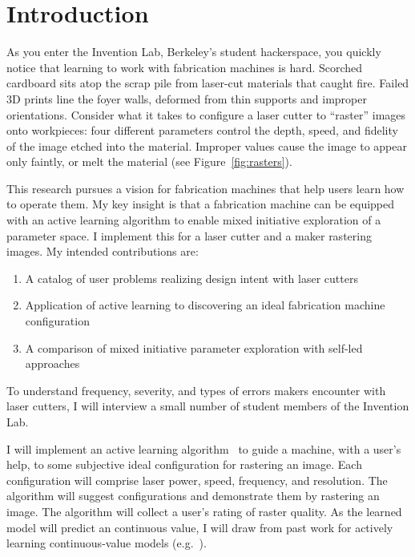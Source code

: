 \section{Introduction}

As you enter the Invention Lab, Berkeley's student hackerspace, you quickly notice that learning to work with fabrication machines is hard.
Scorched cardboard sits atop the scrap pile from laser-cut materials that caught fire.
Failed 3D prints line the foyer walls, deformed from thin supports and improper orientations.
Consider what it takes to configure a laser cutter to ``raster'' images onto workpieces:
four different parameters control the depth, speed, and fidelity of the image etched into the material.
Improper values cause the image to appear only faintly, or melt the material (see Figure~\ref{fig:rasters}).

This research pursues a vision for fabrication machines that help users learn how to operate them.
My key insight is that a fabrication machine can be equipped with an active learning algorithm to enable mixed initiative exploration of a parameter space.
I implement this for a laser cutter and a maker rastering images.
My intended contributions are:
\begin{enumerate}
\item A catalog of user problems realizing design intent with laser cutters
\item Application of active learning to discovering an ideal fabrication machine configuration
\item A comparison of mixed initiative parameter exploration with self-led approaches
\end{enumerate}

To understand frequency, severity, and types of errors makers encounter with laser cutters, I will interview a small number of student members of the Invention Lab.

I will implement an active learning algorithm~\cite{settles_active_2010} to guide a machine, with a user's help, to some subjective ideal configuration for rastering an image.
Each configuration will comprise laser power, speed, frequency, and resolution.
The algorithm will suggest configurations and demonstrate them by rastering an image.
The algorithm will collect a user's rating of raster quality.
As the learned model will predict an continuous value, I will draw from past work for actively learning continuous-value models (e.g.~\cite{sugiyama_active_2008}).

